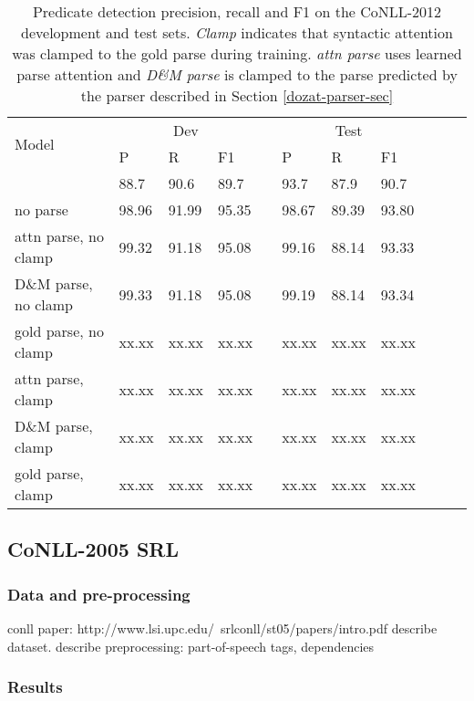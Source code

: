 \documentclass[11pt,a4paper]{article}
\begin{document}
\begin{table*}
\begin{tabular}{lllllllllll}
\multirow{2}{*}{Model} & \multicolumn{3}{c}{Dev} & & \multicolumn{3}{c}{Test} \\  \cline{2-4} \cline{6-8}
& P & R & F1 & & P & R & F1  \\ \hline \hline
\citet{he2017deep} & 88.7 & 90.6 & 89.7 & & 93.7 & 87.9 & 90.7 \\ \hline
no parse &  98.96  & 91.99 &  95.35 & &  98.67 &  89.39  & 93.80 \\
attn parse, no clamp &   99.32 &  91.18 &  95.08 & & 99.16 &  88.14 &  93.33\\
D\&M parse, no clamp & 99.33 &  91.18 &  95.08 & & 99.19 &  88.14 &  93.34 \\
gold parse, no clamp & xx.xx & xx.xx & xx.xx & & xx.xx & xx.xx & xx.xx \\
attn parse, clamp & xx.xx & xx.xx & xx.xx & & xx.xx & xx.xx & xx.xx \\
D\&M parse, clamp & xx.xx & xx.xx & xx.xx & & xx.xx & xx.xx & xx.xx \\
gold parse, clamp & xx.xx & xx.xx & xx.xx & & xx.xx & xx.xx & xx.xx \\

\end{tabular}
\caption{Predicate detection precision, recall and F1 on the CoNLL-2012 development and test sets. \emph{Clamp} indicates that syntactic attention was clamped to the gold parse during training. \emph{attn parse} uses learned parse attention and \emph{D\&M parse} is clamped to the parse predicted by the parser described in Section \ref{dozat-parser-sec}}
\end{table*}

\subsection{CoNLL-2005 SRL}

\subsubsection{Data and pre-processing}
conll paper: http://www.lsi.upc.edu/~srlconll/st05/papers/intro.pdf
describe dataset. describe preprocessing: part-of-speech tags, dependencies

\subsubsection{Results}
\end{document}
